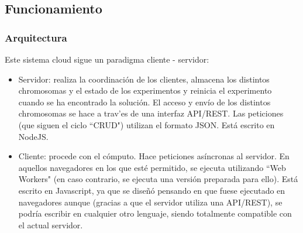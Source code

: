 \documentclass[runningheads,a4paper]{llncs}
\begin{document}
\subsection{Funcionamiento}
\subsubsection{Arquitectura}
Este sistema cloud sigue un paradigma cliente - servidor:
\begin{itemize}
  \item Servidor: realiza la coordinaci\'on de los clientes, almacena los distintos chromosomas y
  el estado de los experimentos y reinicia el experimento cuando se ha encontrado la soluci\'on.
  El acceso y env\'io de los distintos chromosomas se hace a trav'es de una interfaz API/REST.
  Las peticiones (que siguen el ciclo ``CRUD") utilizan el formato JSON. Est\'a escrito en NodeJS.
  \item Cliente: procede con el c\'omputo. Hace peticiones as\'incronas al servidor.
  En aquellos navegadores en los que est\'e permitido, se ejecuta utilizando ``Web Workers"
  (en caso contrario, se ejecuta una versi\'on preparada para ello). Est\'a escrito
  en Javascript, ya que se dise\~n\'o pensando en que fuese ejecutado en navegadores aunque
  (gracias a que el servidor utiliza una API/REST), se podr\'ia escribir en cualquier otro
  lenguaje, siendo totalmente compatible con el actual servidor.
\end{itemize}
\end{document}

